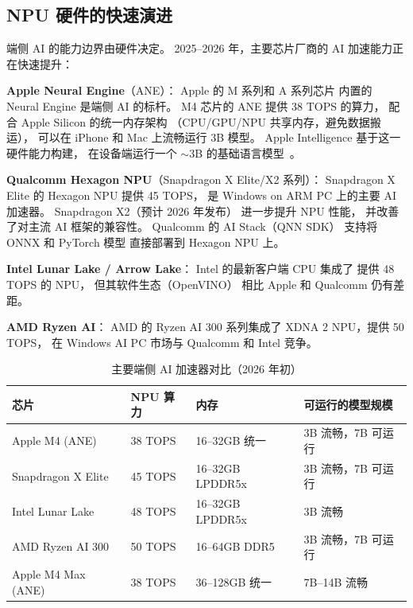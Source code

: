 \subsection{NPU 硬件的快速演进}
\label{sec:npu-hardware}

端侧 AI 的能力边界由硬件决定。
2025--2026 年，主要芯片厂商的 AI 加速能力正在快速提升：

\textbf{Apple Neural Engine}（ANE）：
Apple 的 M 系列和 A 系列芯片
内置的 Neural Engine 是端侧 AI 的标杆。
M4 芯片的 ANE 提供 38 TOPS 的算力，
配合 Apple Silicon 的统一内存架构
（CPU/GPU/NPU 共享内存，避免数据搬运），
可以在 iPhone 和 Mac 上流畅运行 3B 模型。
Apple Intelligence 基于这一硬件能力构建，
在设备端运行一个 $\sim$3B 的基础语言模型~\cite{gunter2024appleintelligence}。

\textbf{Qualcomm Hexagon NPU}（Snapdragon X Elite/X2 系列）：
Snapdragon X Elite 的 Hexagon NPU 提供 45 TOPS，
是 Windows on ARM PC 上的主要 AI 加速器。
Snapdragon X2（预计 2026 年发布）
进一步提升 NPU 性能，
并改善了对主流 AI 框架的兼容性。
Qualcomm 的 AI Stack（QNN SDK）
支持将 ONNX 和 PyTorch 模型
直接部署到 Hexagon NPU 上。

\textbf{Intel Lunar Lake / Arrow Lake}：
Intel 的最新客户端 CPU 集成了
提供 48 TOPS 的 NPU，
但其软件生态（OpenVINO）
相比 Apple 和 Qualcomm 仍有差距。

\textbf{AMD Ryzen AI}：
AMD 的 Ryzen AI 300 系列集成了
XDNA 2 NPU，提供 50 TOPS，
在 Windows AI PC 市场与 Qualcomm 和 Intel 竞争。

\begin{table}[H]
\centering\small
\renewcommand{\arraystretch}{1.3}
\caption{主要端侧 AI 加速器对比（2026 年初）}\label{tab:edge-accelerators}
\begin{tabularx}{\linewidth}{l l l >{\raggedright\arraybackslash}X}
\toprule
\rowcolor{figLightGray}
\textbf{芯片} & \textbf{NPU 算力} & \textbf{内存} & \textbf{可运行的模型规模} \\
\midrule
Apple M4 (ANE) & 38 TOPS & 16--32GB 统一 & 3B 流畅，7B 可运行 \\
Snapdragon X Elite & 45 TOPS & 16--32GB LPDDR5x & 3B 流畅，7B 可运行 \\
Intel Lunar Lake & 48 TOPS & 16--32GB LPDDR5x & 3B 流畅 \\
AMD Ryzen AI 300 & 50 TOPS & 16--64GB DDR5 & 3B 流畅，7B 可运行 \\
Apple M4 Max (ANE) & 38 TOPS & 36--128GB 统一 & 7B--14B 流畅 \\
\bottomrule
\end{tabularx}
\end{table}

